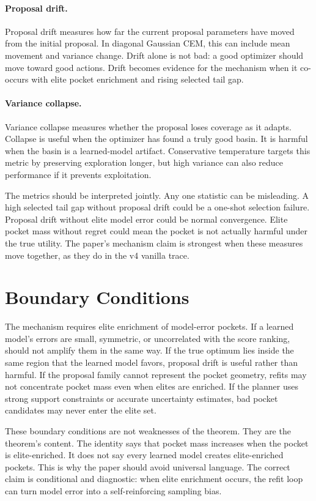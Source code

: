 \paragraph{Proposal drift.}
Proposal drift measures how far the current proposal parameters have moved
from the initial proposal. In diagonal Gaussian CEM, this can include mean
movement and variance change. Drift alone is not bad: a good optimizer should
move toward good actions. Drift becomes evidence for the mechanism when it
co-occurs with elite pocket enrichment and rising selected tail gap.

\paragraph{Variance collapse.}
Variance collapse measures whether the proposal loses coverage as it adapts.
Collapse is useful when the optimizer has found a truly good basin. It is
harmful when the basin is a learned-model artifact. Conservative temperature
targets this metric by preserving exploration longer, but high variance can
also reduce performance if it prevents exploitation.

The metrics should be interpreted jointly. Any one statistic can be
misleading. A high selected tail gap without proposal drift could be a
one-shot selection failure. Proposal drift without elite model error could be
normal convergence. Elite pocket mass without regret could mean the pocket is
not actually harmful under the true utility. The paper's mechanism claim is
strongest when these measures move together, as they do in the v4 vanilla
\cem{} trace.

\section{Boundary Conditions}
\label{app:boundary-conditions}

The mechanism requires elite enrichment of model-error pockets. If a learned
model's errors are small, symmetric, or uncorrelated with the score ranking,
\cem{} should not amplify them in the same way. If the true optimum lies inside
the same region that the learned model favors, proposal drift is useful rather
than harmful. If the proposal family cannot represent the pocket geometry,
refits may not concentrate pocket mass even when elites are enriched. If the
planner uses strong support constraints or accurate uncertainty estimates, bad
pocket candidates may never enter the elite set.

These boundary conditions are not weaknesses of the theorem. They are the
theorem's content. The identity says that pocket mass increases when the
pocket is elite-enriched. It does not say every learned model creates
elite-enriched pockets. This is why the paper should avoid universal language.
The correct claim is conditional and diagnostic: when elite enrichment occurs,
the refit loop can turn model error into a self-reinforcing sampling bias.

